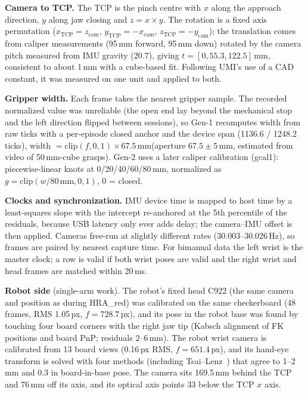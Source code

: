 \documentclass[conference,10pt]{IEEEtran}
\newcommand{\mm}{\,mm\xspace}
\begin{document}
\textbf{Camera to TCP.} The TCP is the pinch centre with $x$ along the approach direction, $y$ along jaw closing and $z=x\times y$.
The rotation is a fixed axis permutation ($x_\text{TCP}=z_\text{cam}$, $y_\text{TCP}=-x_\text{cam}$, $z_\text{TCP}=-y_\text{cam}$);
the translation comes from caliper measurements (95\mm forward, 95\mm down) rotated by the camera pitch measured from IMU gravity
(20.7\textdegree), giving $t=[0, 55.3, 122.5]$\mm, consistent to about 1\mm with a cube-based fit. Following UMI's use of a CAD
constant, it was measured on one unit and applied to both.

\textbf{Gripper width.} Each frame takes the nearest gripper sample. The recorded normalized value was unreliable (the open end
lay beyond the mechanical stop and the left direction flipped between sessions), so Gen-1 recomputes width from raw ticks with
a per-episode closed anchor and the device span (1136.6 / 1248.2 ticks), width $=\mathrm{clip}(f,0,1)\times 67.5$\mm (aperture
$67.5\pm5$\mm, estimated from video of 50\mm-cube grasps). Gen-2 uses a later caliper calibration (gcal1): piecewise-linear
knots at 0/20/40/60/80\mm, normalized as $g=\mathrm{clip}(w/80\,\text{mm},0,1)$, 0 = closed.

\textbf{Clocks and synchronization.} IMU device time is mapped to host time by a least-squares slope with the intercept
re-anchored at the 5th percentile of the residuals, because USB latency only ever adds delay; the camera--IMU offset is then
applied. Cameras free-run at slightly different rates (30.003--30.026\,Hz), so frames are paired by nearest capture time. For
bimanual data the left wrist is the master clock; a row is valid if both wrist poses are valid and the right wrist and head
frames are matched within 20\,ms.

\textbf{Robot side} (single-arm work). The robot's fixed head C922 (the same camera and position as during HRA\_red) was calibrated
on the same checkerboard (48 frames, RMS 1.05\,px, $f=728.7$\,px), and its pose in the robot base was found by touching four board
corners with the right jaw tip (Kabsch alignment of FK positions and board PnP; residuals 2--6\mm). The robot wrist camera is
calibrated from 13 board views (0.16\,px RMS, $f=651.4$\,px), and its hand-eye transform is solved with four methods (including
Tsai--Lenz~\cite{tsai1989handeye}) that agree to 1--2\mm and 0.3\textdegree{} in board-in-base pose. The camera sits 169.5\mm
behind the TCP and 76\mm off its axis, and its optical axis points 33\textdegree{} below the TCP $x$ axis.
\end{document}
